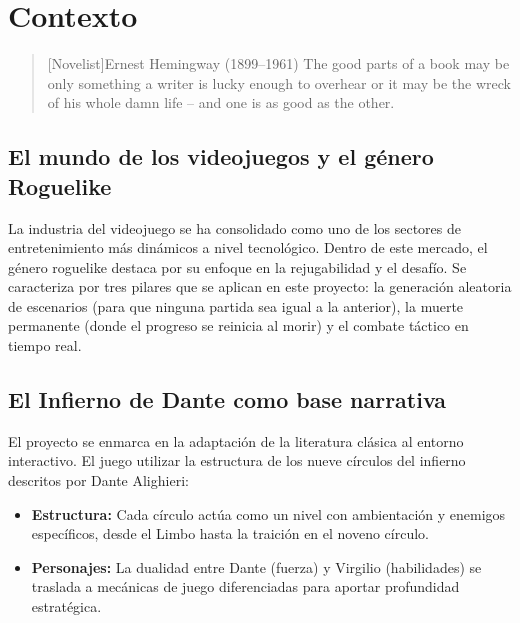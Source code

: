 \chapter{Contexto}

\begin{quotation}[Novelist]{Ernest Hemingway (1899--1961)}
The good parts of a book may be only something a writer is lucky enough to overhear or it may be the wreck of his whole damn life -- and one is as good as the other.
\end{quotation}

\begin{abstract}
En este apartado se describe el marco general del proyecto, 
analizando la relevancia de la industria del videojuego, 
la evolución del género roguelike y cómo la obra clásica de Dante Alighieri 
sirve como base conceptual para la propuesta técnica y artística de Via Inferni.
\end{abstract}

\section{El mundo de los videojuegos y el género Roguelike}

La industria del videojuego se ha consolidado como uno de los sectores de entretenimiento más dinámicos a nivel tecnológico. Dentro de este mercado, el género roguelike destaca por su enfoque en la rejugabilidad y el desafío. Se caracteriza por tres pilares que se aplican en este proyecto: la generación aleatoria de escenarios (para que ninguna partida sea igual a la anterior), la muerte permanente (donde el progreso se reinicia al morir) y el combate táctico en tiempo real.

\section{El Infierno de Dante como base narrativa}

El proyecto se enmarca en la adaptación de la literatura clásica al entorno interactivo. El juego utilizar la estructura de los nueve círculos del infierno descritos por Dante Alighieri:
\begin{itemize}
\item \textbf{Estructura:} Cada círculo actúa como un nivel con ambientación y enemigos específicos, desde el Limbo hasta la traición en el noveno círculo.
\item \textbf{Personajes:} La dualidad entre Dante (fuerza) y Virgilio (habilidades) se traslada a mecánicas de juego diferenciadas para aportar profundidad estratégica.
\end{itemize}

